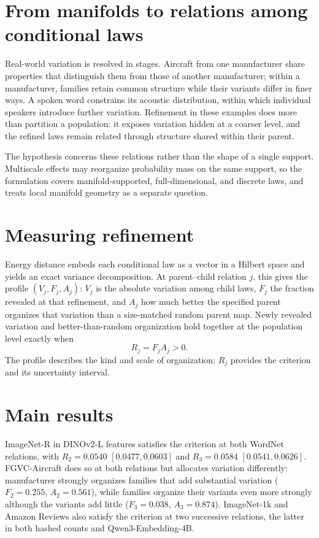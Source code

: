 \documentclass[11pt]{article}
\begin{document}
\section{From manifolds to relations among conditional laws}

Real-world variation is resolved in stages. Aircraft from one manufacturer share properties that distinguish them from those of another manufacturer; within a manufacturer, families retain common structure while their variants differ in finer ways. A spoken word constrains its acoustic distribution, within which individual speakers introduce further variation. Refinement in these examples does more than partition a population: it exposes variation hidden at a coarser level, and the refined laws remain related through structure shared within their parent.

The hypothesis concerns these relations rather than the shape of a single support. Multiscale effects may reorganize probability mass on the same support, so the formulation covers manifold-supported, full-dimensional, and discrete laws, and treats local manifold geometry as a separate question.

\section{Measuring refinement}

Energy distance embeds each conditional law as a vector in a Hilbert space and yields an exact variance decomposition. At parent--child relation $j$, this gives the profile $(V_j,F_j,A_j)$: $V_j$ is the absolute variation among child laws, $F_j$ the fraction revealed at that refinement, and $A_j$ how much better the specified parent organizes that variation than a size-matched random parent map. Newly revealed variation and better-than-random organization hold together at the population level exactly when
\[
R_j=F_jA_j>0 .
\]
The profile describes the kind and scale of organization; $R_j$ provides the criterion and its uncertainty interval.

\section{Main results}

ImageNet-R in DINOv2-L features satisfies the criterion at both WordNet relations, with $R_2=0.0540$ $[0.0477,0.0603]$ and $R_3=0.0584$ $[0.0541,0.0626]$. FGVC-Aircraft does so at both relations but allocates variation differently: manufacturer strongly organizes families that add substantial variation ($F_2=0.255$, $A_2=0.561$), while families organize their variants even more strongly although the variants add little ($F_3=0.038$, $A_3=0.874$). ImageNet-1k and Amazon Reviews also satisfy the criterion at two successive relations, the latter in both hashed counts and Qwen3-Embedding-4B.
\end{document}
